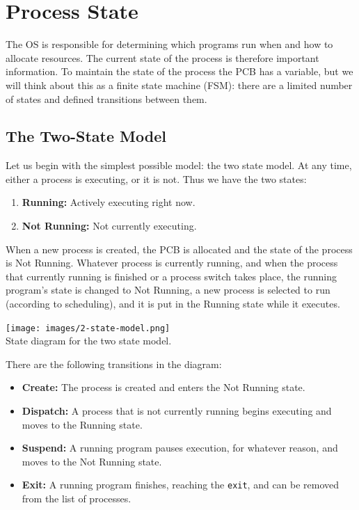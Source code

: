 




\section*{Process State}

The OS is responsible for determining which programs run when and how to allocate resources. The current state of the process is therefore important information. To maintain the state of the process the PCB has a variable, but we will think about this as a finite state machine (FSM): there are a limited number of states and defined transitions between them. 

\subsection*{The Two-State Model}

Let us begin with the simplest possible model: the two state model. At any time, either a process is executing, or it is not. Thus we have the two states: 

\begin{enumerate}
	\item \textbf{Running:} Actively executing right now.
	\item \textbf{Not Running:} Not currently executing.
\end{enumerate}

When a new process is created, the PCB is allocated and the state of the process is Not Running. Whatever process is currently running, and when the process that currently running is finished or a process switch takes place, the running program's state is changed to Not Running, a new process is selected to run (according to scheduling), and it is put in the Running state while it executes.

\begin{center}
\texttt{[image: images/2-state-model.png]}\\
State diagram for the two state model.
\end{center}

There are the following transitions in the diagram:
\begin{itemize}
	\item \textbf{Create:} The process is created and enters the Not Running state.
	\item \textbf{Dispatch:} A process that is not currently running begins executing and moves to the Running state.
	\item \textbf{Suspend:} A running program pauses execution, for whatever reason, and moves to the Not Running state.
	\item \textbf{Exit:} A running program finishes, reaching the \texttt{exit}, and can be removed from the list of processes.
\end{itemize}


